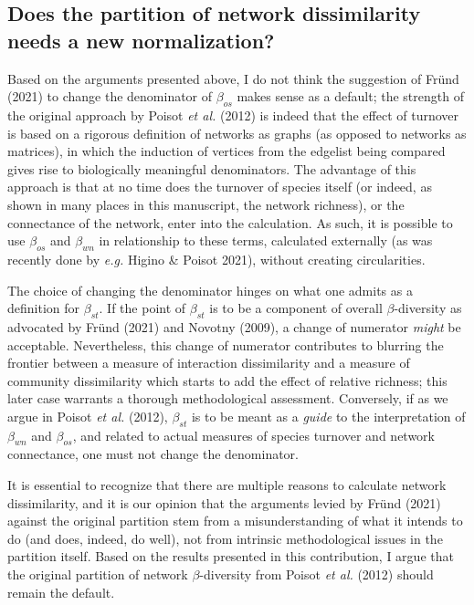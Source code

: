 \documentclass[10pt,oneside]{article}
\begin{document}
\hypertarget{does-the-partition-of-network-dissimilarity-needs-a-new-normalization}{%
\subsection{Does the partition of network dissimilarity needs a new
normalization?}\label{does-the-partition-of-network-dissimilarity-needs-a-new-normalization}}

Based on the arguments presented above, I do not think the suggestion of
Fründ (2021) to change the denominator of \(\beta_{os}\) makes sense as
a default; the strength of the original approach by Poisot \emph{et al.}
(2012) is indeed that the effect of turnover is based on a rigorous
definition of networks as graphs (as opposed to networks as matrices),
in which the induction of vertices from the edgelist being compared
gives rise to biologically meaningful denominators. The advantage of
this approach is that at no time does the turnover of species itself (or
indeed, as shown in many places in this manuscript, the network
richness), or the connectance of the network, enter into the
calculation. As such, it is possible to use \(\beta_{os}\) and
\(\beta_{wn}\) in relationship to these terms, calculated externally (as
was recently done by \emph{e.g.} Higino \& Poisot 2021), without
creating circularities.

The choice of changing the denominator hinges on what one admits as a
definition for \(\beta_{st}\). If the point of \(\beta_{st}\) is to be a
component of overall \(\beta\)-diversity as advocated by Fründ (2021)
and Novotny (2009), a change of numerator \emph{might} be acceptable.
Nevertheless, this change of numerator contributes to blurring the
frontier between a measure of interaction dissimilarity and a measure of
community dissimilarity which starts to add the effect of relative
richness; this later case warrants a thorough methodological assessment.
Conversely, if as we argue in Poisot \emph{et al.} (2012),
\(\beta_{st}\) is to be meant as a \emph{guide} to the interpretation of
\(\beta_{wn}\) and \(\beta_{os}\), and related to actual measures of
species turnover and network connectance, one must not change the
denominator.

It is essential to recognize that there are multiple reasons to
calculate network dissimilarity, and it is our opinion that the
arguments levied by Fründ (2021) against the original partition stem
from a misunderstanding of what it intends to do (and does, indeed, do
well), not from intrinsic methodological issues in the partition itself.
Based on the results presented in this contribution, I argue that the
original partition of network \(\beta\)-diversity from Poisot \emph{et
al.} (2012) should remain the default.
\end{document}
